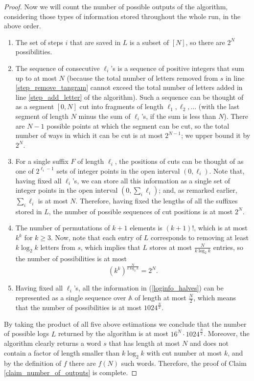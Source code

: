 \documentclass[12pt]{amsart}
\theoremstyle{plain}
\numberwithin{equation}{section}
\begin{document}
\begin{proof}
	Now we will count the number of possible outputs of the algorithm, considering those types of information stored throughout the whole run, in the above order.
	
	\begin{enumerate}
		\item The set of steps $i$ that are saved in $L$ is a subset of $[N]$, so there are $2^N$ possibilities.
		\item The sequence of consecutive $\ell_i$'s is a sequence of positive integers that sum up to at most $N$ (because the total number of letters removed from $s$ in line \ref{step_remove_tangram} cannot exceed the total number of letters added in line \ref{step_add_letter} of the algorithm). Such a sequence can be thought of as a segment $[0,N]$ cut into fragments of length $\ell_1, \ell_2, \ldots$ (with the last segment of length $N$ minus the sum of $\ell_i$'s, if the sum is less than $N$). There are $N-1$ possible points at which the segment can be cut, so the total number of ways in which it can be cut is at most $2^{N-1}$; we upper bound it by $2^N$.
		\item For a single suffix $F$ of length $\ell_i$, the positions of cuts can be thought of as one of $2^{\ell_i - 1}$ sets of integer points in the open interval $(0, \ell_i)$. Note that, having fixed all $\ell_i$'s, we can store all this information as a single set of integer points in the open interval $(0, \sum_i \ell_i)$; and, as remarked earlier, $\sum_i \ell_i$ is at most $N$. Therefore, having fixed the lengths of all the suffixes stored in $L$, the number of possible sequences of cut positions is at most $2^N$.
		\item The number of permutations of $k+1$ elements is $(k+1)!$, which is at most $k^k$ for $k\geqslant 3$. Now, note that each entry of $L$ corresponds to removing at least $k \log_2 k$ letters from $s$, which implies that $L$ stores at most $\frac{N}{k \log_2 k}$ entries, so the number of possibilities is at most
		$$\left(k^k\right)^{\frac{N}{k \log_2 k}} = 2^N.$$
		\item Having fixed all $\ell_i$'s, all the information in (\ref{loginfo_halves}) can be represented as a single sequence over $\mathbb{A}$ of length at most $\frac{N}{2}$, which means that the number of possibilities is at most $1024^{\frac{N}{2}}$.
	\end{enumerate}
	
	By taking the product of all five above estimations we conclude that the number of possible logs $L$ returned by the algorithm is at most $16^N\cdot1024^{\frac{N}{2}}$. Moreover, the algorithm clearly returns a word $s$ that has length at most $N$ and does not contain a factor of length smaller than $k\log_2 k$ with cut number at most $k$, and by the definition of $f$ there are $f(N)$ such words. Therefore, the proof of Claim \ref{claim_number_of_outputs} is complete.
	

\end{proof}
\end{document}
